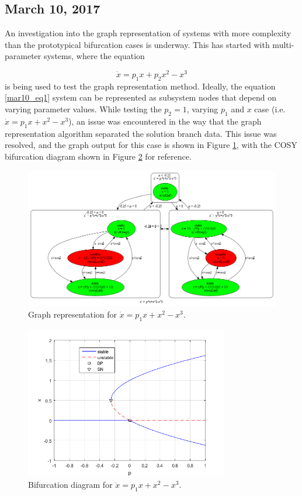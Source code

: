 \documentclass[12pt]{article}
\begin{document}
\subsection{March 10, 2017}
An investigation into the graph representation of systems with more complexity than the prototypical bifurcation cases is underway. This has started with multi-parameter systems, where the equation

\begin{equation}
\label{mar10_eq1}
\dot{x}=p_1x+p_2x^2-x^3
\end{equation}
is being used to test the graph representation method. Ideally, the equation \ref{mar10_eq1} system can be represented as subsystem nodes that depend on varying parameter values. While testing the $p_2=1$, varying $p_1$ and $x$ case (i.e. $\dot{x}=p_1x+x^2-x^3$), an issue was encountered in the way that the graph representation algorithm separated the solution branch data. This issue was resolved, and the graph output for this case is shown in Figure \ref{mar10_graph_mp1}, with the COSY bifurcation diagram shown in Figure \ref{mar10_bfd1} for reference.

\begin{figure}[H]
\begin{center}
\includegraphics[width=6in]{mar10_graph_mp1.png}
\caption{Graph representation for $\dot{x}=p_1x+x^2-x^3$.}
\label{mar10_graph_mp1}
\end{center}
\end{figure}

\begin{figure}[H]
\begin{center}
\includegraphics[width=3.5in]{mar10_bfd1.png}
\caption{Bifurcation diagram for $\dot{x}=p_1x+x^2-x^3$.}
\label{mar10_bfd1}
\end{center}
\end{figure}
\end{document}
